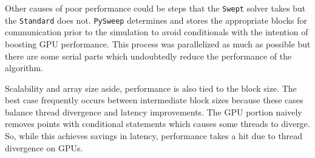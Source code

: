 \documentclass[mca,article,submit,moreauthors,pdftex]{Definitions/mdpi}
\def\pysweep{\texttt{PySweep}}
\def\Swept{\texttt{Swept}}
\def\Standard{\texttt{Standard}}
\begin{document}
\begin{paracol}{2}
Other causes of poor performance could be steps that the \Swept{} solver takes but the \Standard{} does not. \pysweep{} determines and stores the appropriate blocks for communication prior to the simulation to avoid conditionals with the intention of boosting GPU performance. This process was parallelized as much as possible but there are some serial parts which undoubtedly reduce the performance of the algorithm. 

Scalability and array size aside, performance is also tied to the block size. The best case frequently occurs between intermediate block sizes because these cases balance thread divergence and latency improvements. The GPU portion naively removes points with conditional statements which causes some threads to diverge. 
So, while this achieves savings in latency, performance takes a hit due to thread divergence on GPUs.

\end{paracol}
\nointerlineskip
\end{document}
